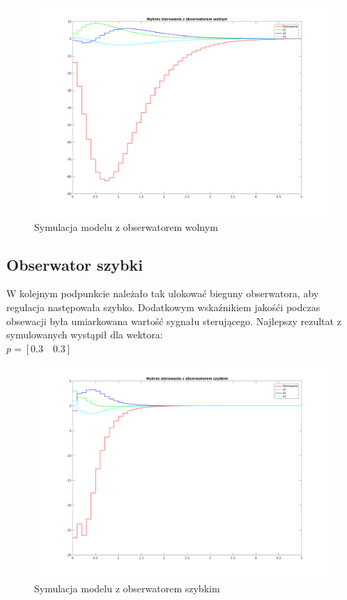 \documentclass[a4paper, 11pt]{article}
\begin{document}
\begin{figure}[H]
\centering
\includegraphics[scale=0.5]{4_a.png}
\caption{Symulacja modelu z obserwatorem wolnym}
\end{figure}

\subsection{Obserwator szybki}
W kolejnym podpunkcie należało tak ulokować bieguny obserwatora, aby regulacja następowała szybko. Dodatkowym wskaźnikiem jakośći podczas obsewacji była umiarkowana wartość sygnału sterującego. Najlepszy rezultat z symulowanych wystąpił dla wektora: \\

$p = [0.3\quad0.3]$\\

\begin{figure}[H]
\centering
\includegraphics[scale=0.5]{4_b.png}
\caption{Symulacja modelu z obserwatorem szybkim}
\end{figure}














      
\end{document}

